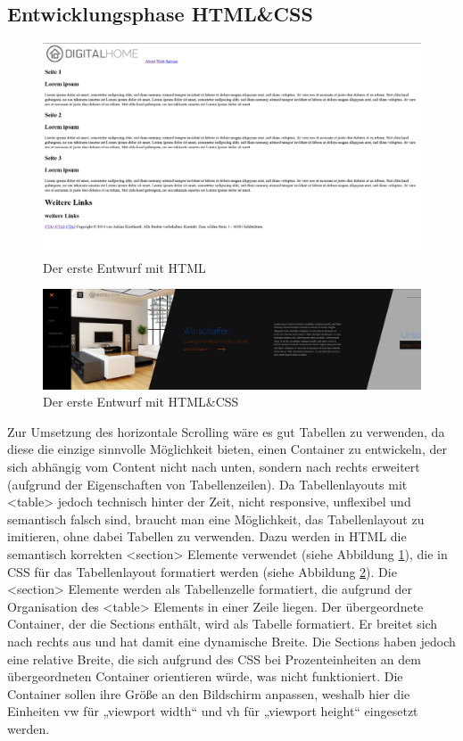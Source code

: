 	\subsection{Entwicklungsphase HTML\&CSS}
\begin{figure} [tp]
\includegraphics[width=\textwidth]{./img/inno_comp2.png}
\caption{Der erste Entwurf mit HTML}
\label{inno_Comp2}
\end{figure}
\begin{figure} [tp]
\includegraphics[width=\textwidth]{./img/inno_comp3.png}
\caption{Der erste Entwurf mit HTML\&CSS}
\label{inno_Comp3}
\end{figure}

Zur Umsetzung des horizontale Scrolling wäre es gut Tabellen zu verwenden, da diese die einzige sinnvolle Möglichkeit bieten, einen Container zu entwickeln, der sich abhängig vom Content nicht nach unten, sondern nach rechts erweitert (aufgrund der Eigenschaften von Tabellenzeilen). Da Tabellenlayouts mit <table> jedoch technisch hinter der Zeit, nicht responsive, unflexibel und semantisch falsch sind, braucht man eine Möglichkeit, das Tabellenlayout zu imitieren, ohne dabei Tabellen zu verwenden. Dazu werden in HTML die semantisch korrekten <section> Elemente verwendet (siehe Abbildung \ref{inno_Comp2}), die in CSS für das Tabellenlayout formatiert werden (siehe Abbildung \ref{inno_Comp3}). Die <section> Elemente werden als Tabellenzelle formatiert, die aufgrund der Organisation des <table> Elements in einer Zeile liegen. Der übergeordnete Container, der die Sections enthält, wird als Tabelle formatiert. Er breitet sich nach rechts aus und hat damit eine dynamische Breite. Die Sections haben jedoch eine relative Breite, die sich aufgrund des CSS bei Prozenteinheiten an dem übergeordneten Container orientieren würde, was nicht funktioniert. Die Container sollen ihre Größe an den Bildschirm anpassen, weshalb hier die Einheiten vw für „viewport width“ und vh für „viewport height“ eingesetzt werden.

